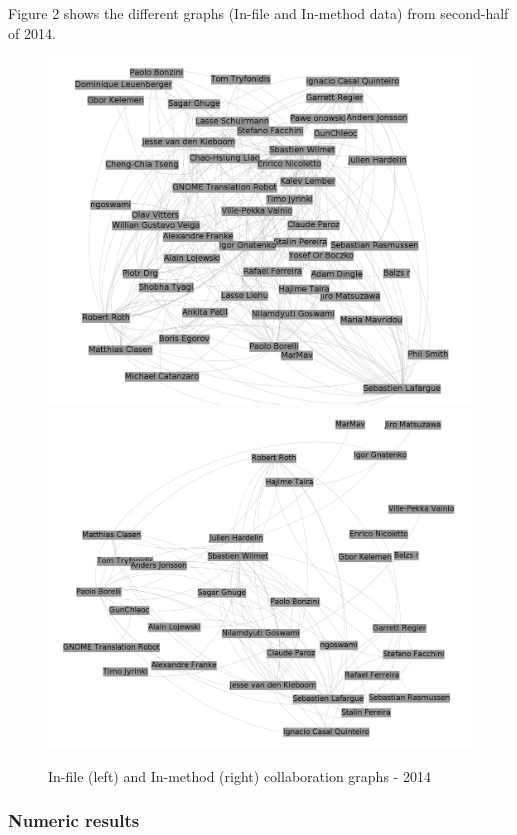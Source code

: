 \documentclass[a4paper]{article}
\begin{document}
Figure 2 shows the different graphs (In-file and In-method data) from
second-half of 2014.

\begin{figure}[ht]
\begin{center}
\includegraphics[scale=0.17]{g2014files.png} 
\includegraphics[scale=0.17]{g2014methods.png}
\caption{In-file (left) and In-method (right) collaboration graphs - 2014}
\label{fig:fixme2}
\end{center}
\end{figure}

\subsubsection{Numeric results}
\end{document}
